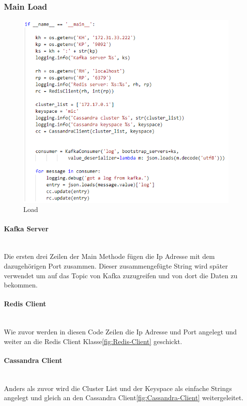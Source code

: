 \subsubsection{Main Load}
\begin{figure}[H]
\centering
  \includegraphics[scale=0.6]{images/MainLoad.PNG}
  \caption[Load]{Load}
  \label{fig:Load}
\end{figure}
\paragraph{Kafka Server}\mbox{} \\
Die ersten drei Zeilen der Main Methode fügen die Ip Adresse mit dem dazugehörigen Port zusammen. Dieser zusammengefügte String wird später verwendet um auf das Topic von Kafka zuzugreifen und von dort die Daten zu bekommen. 
\paragraph{Redis Client}\mbox{} \\
Wie zuvor werden in diesen Code Zeilen die Ip Adresse und Port angelegt und weiter an die Redis Client Klasse\ref{fig:Redis-Client} geschickt. 
\paragraph{Cassandra Client}\mbox{} \\
Anders als zuvor wird die Cluster List und der Keyspace als einfache Strings angelegt und gleich an den Cassandra Client\ref{fig:Cassandra-Client} weitergeleitet. 
